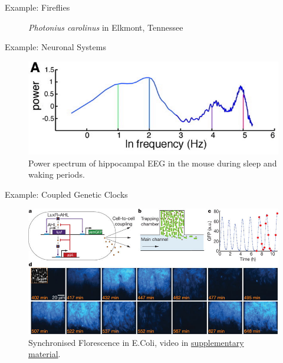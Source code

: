 \documentclass[10pt,reqno]{beamer}
\begin{document}
\begin{frame}{Example: Fireflies\cite{Yiu2017}}
\begin{figure}
\caption{\emph{Photonius carolinus} in Elkmont, Tennessee}
\end{figure}
\end{frame}
\begin{frame}{Example: Neuronal Systems\cite{Buzsaki:2004aa}}
\begin{figure}
\includegraphics[height=0.4\textheight]{science_2004_f1}
\caption{Power spectrum of hippocampal EEG in the mouse during sleep and waking periods.}
\end{figure}
\end{frame}
\begin{frame}{Example: Coupled Genetic Clocks\cite{Danino:2010aa}}
\begin{figure}
\includegraphics[width=0.95\linewidth]{nature08753-f12}
\caption{Synchronised Florescence in E.Coli, video in \href{https://www.nature.com/articles/nature08753}{supplementary material}.}
\end{figure}
\end{frame}
\end{document}
